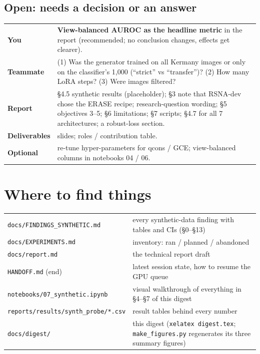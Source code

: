 \documentclass[10pt,a4paper]{article}
\begin{document}
\subsection{Open: needs a decision or an answer}
\begin{center}\small
\begin{tabularx}{\linewidth}{@{}l Y@{}}
\toprule
\textbf{You} & \textbf{View-balanced AUROC as the headline metric} in the report (recommended; no conclusion changes, effects get clearer). \\
\textbf{Teammate} & (1) Was the generator trained on all Kermany images or only on the classifier's 1,000 (``strict'' vs ``transfer'')? (2) How many LoRA steps? (3) Were images filtered? \\
\textbf{Report} & §4.5 synthetic results (placeholder); §3 note that RSNA-dev chose the ERASE recipe; research-question wording; §5 objectives 3--5; §6 limitations; §7 scripts; §4.7 for all 7 architectures; a robust-loss section. \\
\textbf{Deliverables} & slides; roles / contribution table. \\
\textbf{Optional} & re-tune hyper-parameters for qcons / GCE; view-balanced columns in notebooks 04 / 06. \\
\bottomrule
\end{tabularx}
\end{center}

\section{Where to find things}
\begin{center}\small
\begin{tabularx}{\linewidth}{@{}l Y@{}}
\toprule
\texttt{docs/FINDINGS_SYNTHETIC.md} & every synthetic-data finding with tables and CIs (§0--§13) \\
\texttt{docs/EXPERIMENTS.md} & inventory: ran / planned / abandoned \\
\texttt{docs/report.md} & the technical report draft \\
\texttt{HANDOFF.md} (end) & latest session state, how to resume the GPU queue \\
\texttt{notebooks/07_synthetic.ipynb} & visual walkthrough of everything in §4--§7 of this digest \\
\texttt{reports/results/synth_probe/*.csv} & result tables behind every number \\
\texttt{docs/digest/} & this digest (\texttt{xelatex digest.tex}; \texttt{make_figures.py} regenerates its three summary figures) \\
\bottomrule
\end{tabularx}
\end{center}
\end{document}
